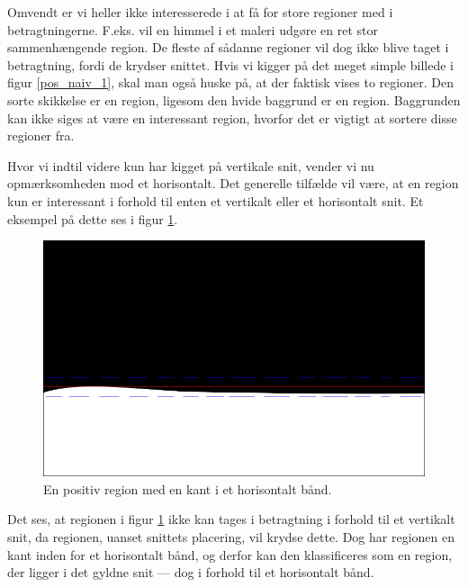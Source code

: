{Omvendt er vi heller ikke interesserede i at få for store regioner med i
betragtningerne.  F.eks. vil en himmel i et maleri udgøre en ret stor
sammenhængende region.  De fleste af sådanne regioner vil dog ikke blive
taget i betragtning, fordi de krydser snittet.  Hvis vi kigger på det
meget simple billede i figur \ref{pos_naiv_1}, skal man også huske på, at
der faktisk vises to regioner. Den sorte skikkelse er en region, ligesom
den hvide baggrund er en region.  Baggrunden kan ikke siges at være en
interessant region, hvorfor det er vigtigt at sortere disse regioner
fra.

Hvor vi indtil videre kun har kigget på vertikale snit, vender vi nu
opmærksomheden mod et horisontalt.  Det generelle tilfælde vil være,
at en region kun er interessant i forhold til enten et vertikalt eller
et horisontalt snit.  Et eksempel på dette ses i figur
\ref{pos_horiz_naiv_margin_1}.

\begin{figure}[H]
    \begin{center}
        \includegraphics[scale=\imgscale,angle=0]{afsnit/vores_implementation/billeder/naiv_algoritme/naiv_horiz_positiv_blob_1}
    \end{center}
    \caption[Positiv horisontal region]{En positiv region med en
    kant i et horisontalt bånd.}
    \label{pos_horiz_naiv_margin_1}
\end{figure}
Det ses, at regionen i figur \ref{pos_horiz_naiv_margin_1} ikke
kan tages i betragtning i forhold til et vertikalt snit, da regionen,
uanset snittets placering, vil krydse dette.  Dog har regionen en kant
inden for et horisontalt bånd, og derfor kan den klassificeres som en
region, der ligger i det gyldne snit --- dog i forhold til et
horisontalt bånd.

}
